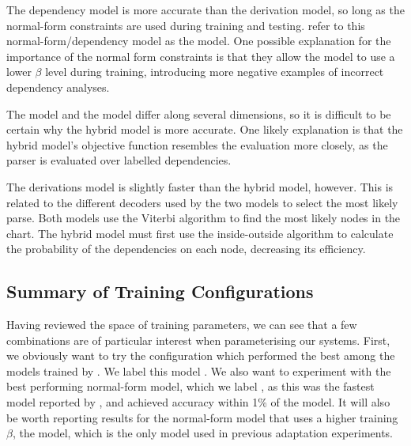 The dependency model is more accurate than the derivation model, so long as the
normal-form constraints are used during training and testing. \citet{clark:cl07}
refer to this normal-form/dependency model as the \hybrid model. One possible
explanation for the importance of the normal form constraints is that they allow the
model to use a lower $\beta$ level during training, introducing more negative examples
of incorrect dependency analyses.

The \hybrid model and the \derivs model differ along several dimensions, so it
is difficult to be certain why the hybrid model is more accurate. One likely explanation
is that the hybrid model's objective function resembles the evaluation more closely, as
the parser is evaluated over labelled dependencies.

The derivations model is slightly faster than the hybrid model, however. This is related
to the different decoders used by the two models to select the most likely parse. Both
models use the Viterbi algorithm to find the most likely nodes in the chart. The hybrid
model must first use the inside-outside algorithm to calculate the probability of
the  dependencies on each node, decreasing its efficiency.

\subsection{Summary of Training Configurations}
\label{sec:system_summary}
Having reviewed the space of training parameters, we can see that a few
combinations are of particular interest when parameterising our systems. First,
we obviously want to try the configuration which performed the best among the
models trained by \citet{clark:cl07}. We label this model \hybrid.
We also want to experiment with the best performing normal-form model, which we
label \derivsrev, as this was the fastest model reported by \citet{clark:cl07},
and achieved accuracy within 1\% of the \hybrid model. It will also be worth
reporting results for the normal-form model that uses a higher training $\beta$,
the \derivsbad model, which is the only model used in previous \ccgbank
adaptation experiments.


